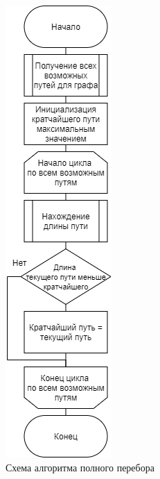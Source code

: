\documentclass[12pt]{report}
\begin{document}
\begin{figure}[H]
        	\centering
        	\includegraphics[scale = 0.4]{BruteForce.png}
        	\caption{Схема алгоритма полного перебора}
        	\label{fig:f_p}
\end{figure}  
\end{document}
